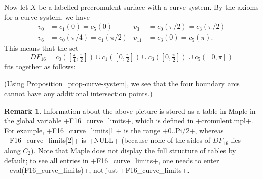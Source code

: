 \documentclass[reqno]{amsart}
\newcommand{\ppi}       {\tfrac{\pi}{2}}
\renewcommand{\ss}{\scriptstyle}
\renewcommand{\:}{\colon}
\theoremstyle{definition}
\newtheorem{remark}[theorem]{Remark}
\begin{document}
Now let $X$ be a labelled precromulent surface with a curve system.
By the axioms for a curve system, we have
\begin{align*}
 v_0 &= c_1(0) = c_5(0) &
 v_3 &= c_0(\pi/2) = c_3(\pi/2) \\
 v_6 &= c_0(\pi/4) = c_1(\pi/2) &
 v_{11} &= c_3(0) = c_5(\pi).
\end{align*}
This means that the set
\[ DF_{16} =
    c_0([\tfrac{\pi}{4},\ppi]) \cup
    c_1([0,\ppi]) \cup
    c_3([0,\ppi]) \cup
    c_5([0,\pi])
\]
fits together as follows:
\begin{center}
\end{center}
(Using Proposition~\ref{prop-curve-system}, we see that the four
boundary arcs cannot have any additional intersection points.)
\begin{remark}
 Information about the above picture is stored as a table in Maple in
 the global variable \mcode+F16_curve_limits+, which is defined in
 \fname+cromulent.mpl+.  For example, \mcode+F16_curve_limits[1]+ is
 the range \mcode+0..Pi/2+, whereas \mcode+F16_curve_limits[2]+ is
 \mcode+NULL+ (because none of the sides of $DF_{16}$ lies along
 $C_2$).  Note that Maple does not display the full structure of
 tables by default; to see all entries in \mcode+F16_curve_limits+, one
 needs to enter \mcode+eval(F16_curve_limits)+, not just
 \mcode+F16_curve_limits+.
\end{remark}
\end{document}
